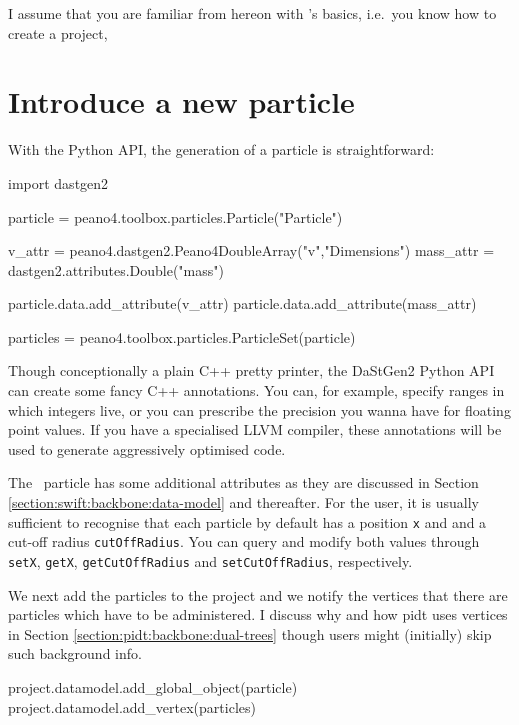 \noindent
I assume that you are familiar from hereon with \Peano's basics, i.e.~you know 
how to create a project, 


\section{Introduce a new particle}

With the Python API, the generation of a particle is straightforward:

\begin{code}
import dastgen2


particle = peano4.toolbox.particles.Particle("Particle")

v_attr = peano4.dastgen2.Peano4DoubleArray("v","Dimensions")
mass_attr = dastgen2.attributes.Double("mass")

particle.data.add_attribute(v_attr)
particle.data.add_attribute(mass_attr)

particles = peano4.toolbox.particles.ParticleSet(particle)
\end{code}

\begin{remark}
 Though conceptionally a plain C++ pretty printer, the DaStGen2 Python API
 can create some fancy C++ annotations. You can, for example, specify ranges
 in which integers live, or you can prescribe the precision you wanna have 
 for floating point values. If you have a specialised LLVM compiler, these
 annotations will be used to generate aggressively optimised code.
\end{remark}


\noindent
The \Peano\ particle has some additional attributes as they are discussed in 
Section \ref{section:swift:backbone:data-model} and thereafter. 
For the user, it is usually sufficient to recognise that each particle by 
default has a position \texttt{x} and and a cut-off radius
\texttt{cutOffRadius}.
You can query and modify both values through \texttt{setX}, \texttt{getX},
\texttt{getCutOffRadius} and \texttt{setCutOffRadius}, respectively.


We next add the particles to the project and we notify the vertices that there 
are particles which have to be administered. 
I discuss why and how pidt uses vertices in Section
\ref{section:pidt:backbone:dual-trees} though users might (initially) skip such
background info. 

\begin{code}
project.datamodel.add_global_object(particle)
project.datamodel.add_vertex(particles)
\end{code}

